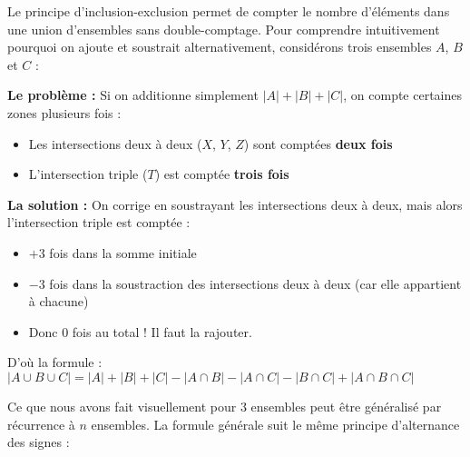 \begin{intuitionbox}
Le principe d'inclusion-exclusion permet de compter le nombre d'éléments dans une union d'ensembles sans double-comptage. Pour comprendre intuitivement pourquoi on ajoute et soustrait alternativement, considérons trois ensembles $A$, $B$ et $C$ :

\begin{center}
\end{center}

\textbf{Le problème :} Si on additionne simplement $|A| + |B| + |C|$, on compte certaines zones plusieurs fois :
\begin{itemize}
    \item Les intersections deux à deux ($X$, $Y$, $Z$) sont comptées \textbf{deux fois}
    \item L'intersection triple ($T$) est comptée \textbf{trois fois}
\end{itemize}

\textbf{La solution :} On corrige en soustrayant les intersections deux à deux, mais alors l'intersection triple est comptée :
\begin{itemize}
    \item $+3$ fois dans la somme initiale
    \item $-3$ fois dans la soustraction des intersections deux à deux (car elle appartient à chacune)
    \item Donc $0$ fois au total ! Il faut la rajouter.
\end{itemize}

D'où la formule : $|A \cup B \cup C| = |A| + |B| + |C| - |A \cap B| - |A \cap C| - |B \cap C| + |A \cap B \cap C|$
\end{intuitionbox}

Ce que nous avons fait visuellement pour 3 ensembles peut être généralisé par récurrence à $n$ ensembles. La formule générale suit le même principe d'alternance des signes :

